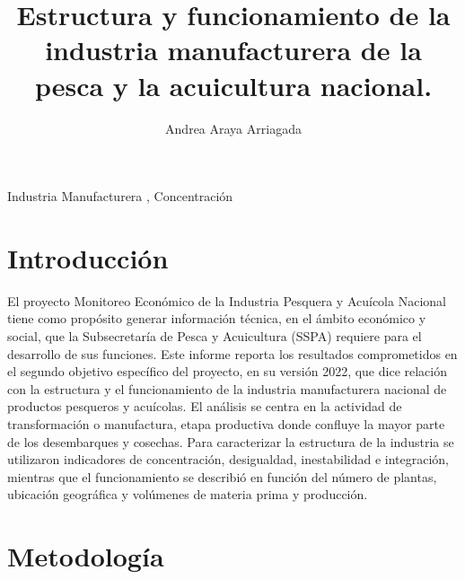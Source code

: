 \documentclass[
  super,
  preprint,
  3p]{elsarticle}
\begin{document}
\begin{frontmatter}
\title{Estructura y funcionamiento de la industria manufacturera de la
pesca y la acuicultura nacional.}
\author[1]{Andrea Araya Arriagada%
%
}



        





\begin{keyword}
    Industria Manufacturera \sep 
    Concentración
\end{keyword}
\end{frontmatter}
    \ifdefined\Shaded\renewenvironment{Shaded}{\begin{tcolorbox}[breakable, boxrule=0pt, enhanced, frame hidden, sharp corners, interior hidden, borderline west={3pt}{0pt}{shadecolor}]}{\end{tcolorbox}}\fi

\hypertarget{introducciuxf3n}{%
\section{Introducción}\label{introducciuxf3n}}

El proyecto Monitoreo Económico de la Industria Pesquera y Acuícola
Nacional tiene como propósito generar información técnica, en el ámbito
económico y social, que la Subsecretaría de Pesca y Acuicultura (SSPA)
requiere para el desarrollo de sus funciones. Este informe reporta los
resultados comprometidos en el segundo objetivo específico del proyecto,
en su versión 2022, que dice relación con la estructura y el
funcionamiento de la industria manufacturera nacional de productos
pesqueros y acuícolas. El análisis se centra en la actividad de
transformación o manufactura, etapa productiva donde confluye la mayor
parte de los desembarques y cosechas. Para caracterizar la estructura de
la industria se utilizaron indicadores de concentración, desigualdad,
inestabilidad e integración, mientras que el funcionamiento se describió
en función del número de plantas, ubicación geográfica y volúmenes de
materia prima y producción.

\hypertarget{metodologuxeda}{%
\section{Metodología}\label{metodologuxeda}}
\end{document}
